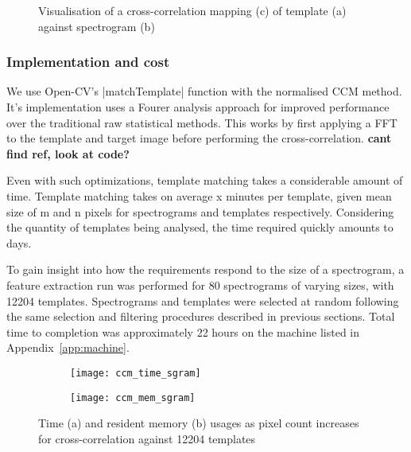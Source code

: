 \begin{figure}[t!]
  \centering
  \begin{subfigure}[t]{0.5\textwidth}
    \centering
    \caption{}
  \end{subfigure}
  \begin{subfigure}[t]{0.5\textwidth}
    \centering
    \caption{}
  \end{subfigure}
  \begin{subfigure}[t]{0.5\textwidth}
    \centering
    \caption{}
  \end{subfigure}
  \caption{Visualisation of a cross-correlation mapping (c) of template (a) against
  spectrogram (b)}
  \label{fig:ccm}
\end{figure}

\subsubsection{Implementation and cost}
We use Open-CV's |matchTemplate| function with the normalised CCM method.
It's implementation uses a Fourer analysis approach for improved performance over
the traditional raw statistical methods.
This works by first applying a FFT to the template and target image before
performing the cross-correlation.
\textbf{cant find ref, look at code?}

Even with such optimizations, template matching takes a considerable amount of
time.
Template matching takes on average x minutes per template, given
mean size of m and n pixels for spectrograms and templates respectively.
Considering the quantity of templates being analysed, the time required quickly
amounts to days.

To gain insight into how the requirements respond to the size of a
spectrogram, a feature extraction run was performed for 80 spectrograms of
varying sizes, with 12204 templates.
Spectrograms and templates were selected at random following the same selection
and filtering procedures described in previous sections.
Total time to completion was approximately 22 hours on the machine listed in
Appendix~\ref{app:machine}.

\begin{figure}[t!]
  \centering
  \begin{subfigure}[t]{0.5\textwidth}
    \centering
    \texttt{[image: ccm\_time\_sgram]}
    \caption{}
  \end{subfigure}%
  \begin{subfigure}[t]{0.5\textwidth}
    \centering
    \texttt{[image: ccm\_mem\_sgram]}
    \caption{}
  \end{subfigure}
  \caption{Time (a) and resident memory (b) usages as pixel count increases for
  cross-correlation against 12204 templates}
\end{figure}

